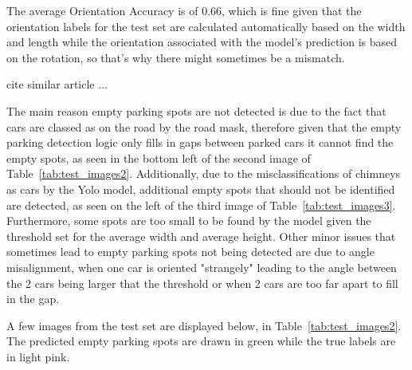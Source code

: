 The average Orientation Accuracy is of 0.66, which is fine given that the orientation labels for the test set are calculated automatically based on the width and length while the orientation associated with the model’s prediction is based on the rotation, so that’s why there might sometimes be a mismatch.


cite similar article ...

The main reason empty parking spots are not detected is due to the fact that cars are classed as on the road by the road mask, therefore given that the empty parking detection logic only fills in gaps between parked cars it cannot find the empty spots, as seen in the bottom left of the second image of Table~\ref{tab:test_images2}.
Additionally, due to the misclassifications of chimneys as cars by the Yolo model, additional empty spots that should not be identified are detected, as seen on the left of the third image of Table~\ref{tab:test_images3}.
Furthermore, some spots are too small to be found by the model given the threshold set for the average width and average height.
Other minor issues that sometimes lead to empty parking spots not being detected are due to angle misalignment, when one car is oriented "strangely" leading to the angle between the 2 cars being larger that the threshold or when 2 cars are too far apart to fill in the gap.

A few images from the test set are displayed below, in Table~\ref{tab:test_images2}.
The predicted empty parking spots are drawn in green while the true labels are in light pink.

